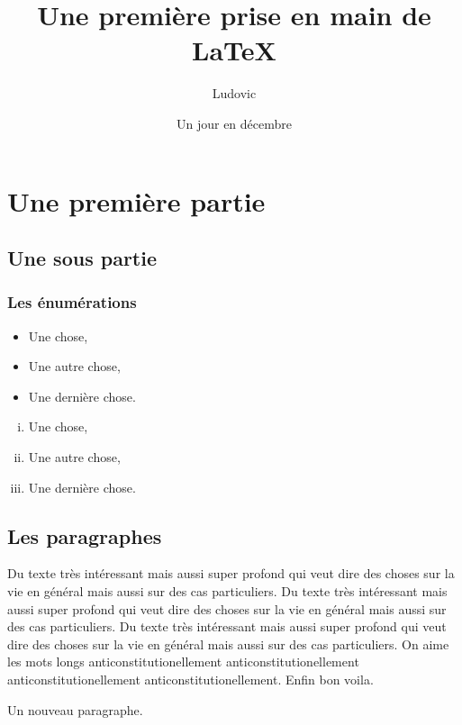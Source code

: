 \documentclass[a4paper, twoside, 10pt]{article}
\author{Ludovic}
\title{Une première prise en main de \LaTeX}
\date{Un jour en décembre}
\begin{document}
\maketitle %
\tableofcontents %

\section{Une première partie} %

\subsection{Une sous partie}

\subsubsection{Les énumérations}

\begin{itemize}
\item Une chose,
\item Une autre chose,
\item Une dernière chose.
\end{itemize}

\begin{enumerate}[i)]
\item Une chose,
\item Une autre chose,
\item Une dernière chose.
\end{enumerate}

\subsection{Les paragraphes}

Du texte très intéressant mais aussi super profond qui veut dire des choses sur la vie en général mais aussi sur des cas particuliers. 
Du texte très intéressant mais aussi super profond qui veut dire des choses sur la vie en général mais aussi sur des cas particuliers.
Du texte très intéressant mais aussi super profond qui veut dire des choses sur la vie en général mais aussi sur des cas particuliers.
On aime les mots longs anticonstitutionellement anticonstitutionellement anticonstitutionellement anticonstitutionellement.
Enfin bon voila.


Un nouveau paragraphe. 
\end{document}

